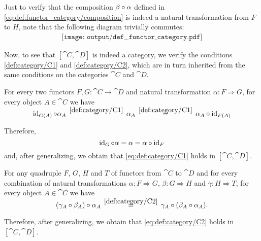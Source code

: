 \begin{defproof}
  Just to verify that the composition \( \beta \bincirc \alpha \) defined in \eqref{eq:def:functor_category/composition} is indeed a natural transformation from \( F \) to \( H \), note that the following diagram trivially commutes:
  \begin{equation}\label{def:functor_category/composition}
    \begin{aligned}
      \texttt{[image: output/def\_\_functor\_category.pdf]}
    \end{aligned}
  \end{equation}

  Now, to see that \( [\cat{C}, \cat{D}] \) is indeed a category, we verify the conditions \ref{def:category/C1} and \ref{def:category/C2}, which are in turn inherited from the same conditions on the categories \( \cat{C} \) and \( \cat{D} \).

   For every two functors \( F, G: \cat{C} \to \cat{D} \) and natural transformation \( \alpha: F \Rightarrow G \), for every object \( A \in \cat{C} \) we have
  \begin{equation*}
    \id_{G(A)} \bincirc \alpha_A
    \reloset{\eqref{def:category/C1}} =
    \alpha_A
    \reloset{\eqref{def:category/C1}} =
    \alpha_A \bincirc \id_{F(A)}
  \end{equation*}

  Therefore,
  \begin{equation*}
    \id_G \bincirc \alpha = \alpha = \alpha \bincirc \id_F
  \end{equation*}
  and, after generalizing, we obtain that \eqref{eq:def:category/C1} holds in \( [\cat{C}, \cat{D}] \).

   For any quadruple \( F \), \( G \), \( H \) and \( T \) of functors from \( \cat{C} \) to \( \cat{D} \) and for every combination of natural transformations \( \alpha: F \Rightarrow G \), \( \beta: G \Rightarrow H \) and \( \gamma: H \Rightarrow T \), for every object \( A \in \cat{C} \) we have
  \begin{equation*}
    (\gamma_A \bincirc \beta_A) \bincirc \alpha_A
    \reloset{\eqref{def:category/C2}} =
    \gamma_A \bincirc (\beta_A \bincirc \alpha_A).
  \end{equation*}

  Therefore, after generalizing, we obtain that \eqref{eq:def:category/C2} holds in \( [\cat{C}, \cat{D}] \).
\end{defproof}

